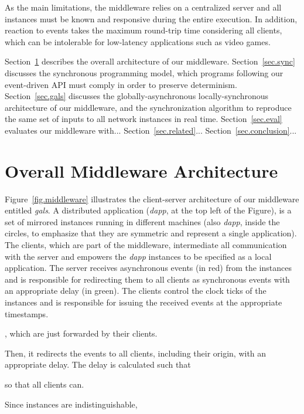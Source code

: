 \documentclass[sigplan,screen]{acmart}
\begin{document}
As the main limitations, the middleware relies on a centralized server and all
instances must be known and responsive during the entire execution.
In addition, reaction to events takes the maximum round-trip time considering
all clients, which can be intolerable for low-latency applications such as
video games.

Section~\ref{sec.arch} describes the overall architecture of our middleware.
Section~\ref{sec.sync} discusses the synchronous programming model, which
programs following our event-driven API must comply in order to preserve
determinism.
Section~\ref{sec.gals} discusses the globally-asynchronous locally-synchronous
architecture of our middleware, and the synchronization algorithm to reproduce
the same set of inputs to all network instances in real time.
Section~\ref{sec.eval} evaluates our middleware with...
Section~\ref{sec.related}...
Section~\ref{sec.conclusion}...

\section{Overall Middleware Architecture}
\label{sec.arch}

Figure~\ref{fig.middleware} illustrates the client-server architecture of our
middleware entitled \emph{gals}.
A distributed application (\emph{dapp}, at the top left of the Figure), is a
set of mirrored instances running in different machines (also \emph{dapp},
inside the circles, to emphasize that they are symmetric and represent a single
application).
The clients, which are part of the middleware, intermediate all communication
with the server and empowers the \emph{dapp} instances to be specified as a
local application.
The server receives asynchronous events (in red) from the instances and is
responsible for redirecting them to all clients as synchronous events with an
appropriate delay (in green).
The clients control the clock ticks of the instances and is responsible for
issuing the received events at the appropriate timestamps.



, which are
just forwarded by their clients.




Then, it redirects the events to all clients, including their origin, with an
appropriate delay.
The delay is calculated such that 

 so that all clients can.


Since instances are indistinguishable,
\end{document}
